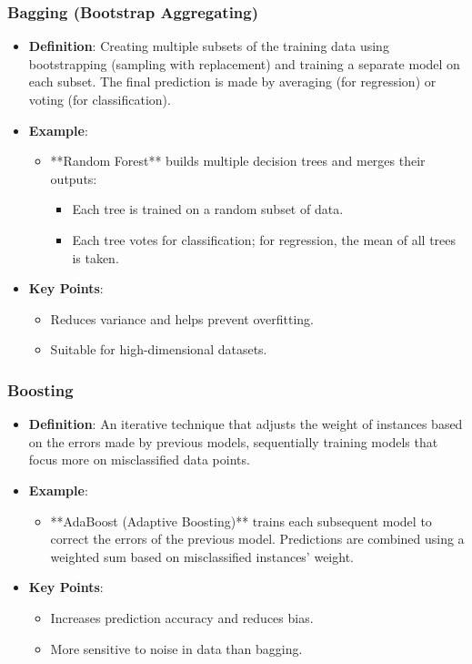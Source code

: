\documentclass[aspectratio=169]{beamer}
\begin{document}
\begin{frame}
    \frametitle{Bagging (Bootstrap Aggregating)}
    \begin{itemize}
        \item \textbf{Definition}: Creating multiple subsets of the training data using bootstrapping (sampling with replacement) and training a separate model on each subset. The final prediction is made by averaging (for regression) or voting (for classification).
        
        \item \textbf{Example}: 
        \begin{itemize}
            \item **Random Forest** builds multiple decision trees and merges their outputs:
            \begin{itemize}
                \item Each tree is trained on a random subset of data.
                \item Each tree votes for classification; for regression, the mean of all trees is taken.
            \end{itemize}
        \end{itemize}
        
        \item \textbf{Key Points}:
        \begin{itemize}
            \item Reduces variance and helps prevent overfitting.
            \item Suitable for high-dimensional datasets.
        \end{itemize}
    \end{itemize}
\end{frame}

\begin{frame}
    \frametitle{Boosting}
    \begin{itemize}
        \item \textbf{Definition}: An iterative technique that adjusts the weight of instances based on the errors made by previous models, sequentially training models that focus more on misclassified data points.
        
        \item \textbf{Example}: 
        \begin{itemize}
            \item **AdaBoost (Adaptive Boosting)** trains each subsequent model to correct the errors of the previous model. Predictions are combined using a weighted sum based on misclassified instances' weight.
        \end{itemize}
        
        \item \textbf{Key Points}:
        \begin{itemize}
            \item Increases prediction accuracy and reduces bias.
            \item More sensitive to noise in data than bagging.
        \end{itemize}
    \end{itemize}
\end{frame}
\end{document}
